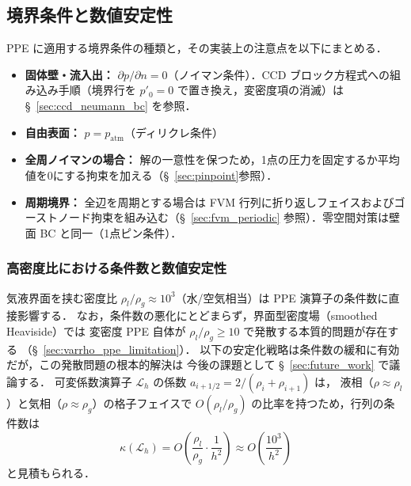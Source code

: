 %
%
\subsection{境界条件と数値安定性}
\label{sec:ppe_bc_stability}

PPE に適用する境界条件の種類と，その実装上の注意点を以下にまとめる．
\begin{itemize}
    \item \textbf{固体壁・流入出：} $\partial p/\partial n = 0$（ノイマン条件）．CCD ブロック方程式への組み込み手順（境界行を $p'_0=0$ で置き換え，変密度項の消滅）は §~\ref{sec:ccd_neumann_bc} を参照．
    \item \textbf{自由表面：} $p = p_{\mathrm{atm}}$（ディリクレ条件）
    \item \textbf{全周ノイマンの場合：} 解の一意性を保つため，1点の圧力を固定するか平均値を0にする拘束を加える（§~\ref{sec:pinpoint}参照）．
    \item \textbf{周期境界：} 全辺を周期とする場合は FVM 行列に折り返しフェイスおよびゴーストノード拘束を組み込む（§~\ref{sec:fvm_periodic} 参照）．零空間対策は壁面 BC と同一（1点ピン条件）．
\end{itemize}


\subsubsection{高密度比における条件数と数値安定性}
\label{sec:ppe_condition_number}

気液界面を挟む密度比 $\rho_l/\rho_g \approx 10^3$（水/空気相当）は
PPE 演算子の条件数に直接影響する．
なお，条件数の悪化にとどまらず，界面型密度場（smoothed Heaviside）では
変密度 PPE 自体が $\rho_l/\rho_g \geq 10$ で発散する本質的問題が存在する
（§~\ref{sec:varrho_ppe_limitation}）．
以下の安定化戦略は条件数の緩和に有効だが，この発散問題の根本的解決は
今後の課題として §~\ref{sec:future_work} で議論する．
可変係数演算子 $\mathcal{L}_h$ の係数 $a_{i+1/2} = 2/(\rho_i+\rho_{i+1})$ は，
液相（$\rho \approx \rho_l$）と気相（$\rho \approx \rho_g$）の格子フェイスで
$O(\rho_l/\rho_g)$ の比率を持つため，行列の条件数は
\begin{equation}
  \kappa(\mathcal{L}_h) = O\!\left(\frac{\rho_l}{\rho_g}\cdot\frac{1}{h^2}\right)
  \approx O\!\left(\frac{10^3}{h^2}\right)
  \label{eq:ppe_cond_number}
\end{equation}
と見積もられる．

